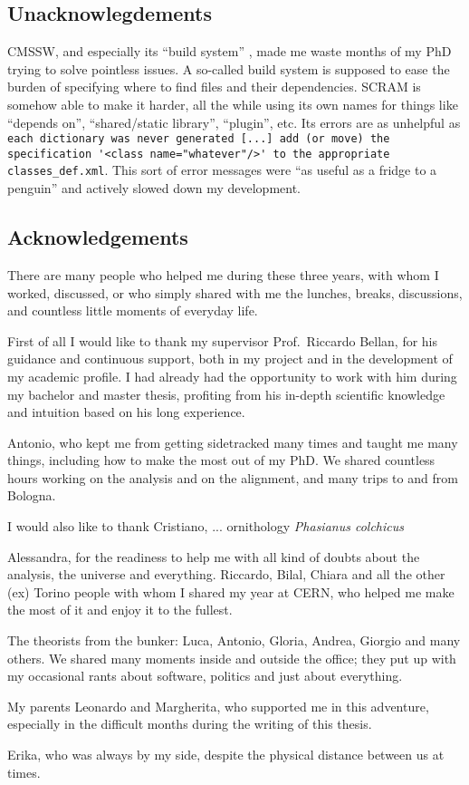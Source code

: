 \subsection{Unacknowlegdements}
CMSSW, and especially its ``build system'' , made me waste months of my PhD trying to solve pointless issues.
A so-called build system is supposed to ease the burden of specifying where to find files and their dependencies.
SCRAM is somehow able to make it harder, all the while using its own names for things like ``depends on'', ``shared/static library'', ``plugin'', etc.
Its errors are as unhelpful as \verb|each dictionary was never generated [...] add (or move) the specification '<class name="whatever"/>' to the appropriate classes_def.xml|.
This sort of error messages were ``as useful as a fridge to a penguin'' and actively slowed down my development.

\subsection{Acknowledgements}
There are many people who helped me during these three years, with whom I worked, discussed,
or who simply shared with me the lunches, breaks, discussions, and countless little moments of everyday life.

First of all I would like to thank my supervisor Prof.~Riccardo Bellan, for his guidance and continuous support,
both in my project and in the development of my academic profile.
I had already had the opportunity to work with him during my bachelor and master thesis,
profiting from his in-depth scientific knowledge and intuition based on his long experience.

Antonio, who kept me from getting sidetracked many times and taught me many things, including how to make the most out of my PhD.
We shared countless hours working on the analysis and on the alignment, and many trips to and from Bologna.

I would also like to thank Cristiano, ...
ornithology
\textit{Phasianus colchicus}

Alessandra, for the readiness to help me with all kind of doubts about the analysis, the universe and everything.
Riccardo, Bilal, Chiara and all the other (ex) Torino people with whom I shared my year at CERN, who helped me make the most of it and enjoy it to the fullest.

The theorists from the bunker: Luca, Antonio, Gloria, Andrea, Giorgio and many others.
We shared many moments inside and outside the office;
they put up with my occasional rants about software, politics and just about everything.


My parents Leonardo and Margherita, who supported me in this adventure, especially in the difficult months during the writing of this thesis.

Erika, who was always by my side, despite the physical distance between us at times.
